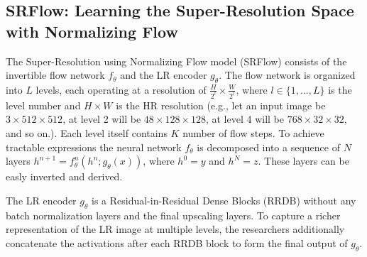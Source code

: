 \documentclass{article}
\begin{document}
\subsection{SRFlow: Learning the Super-Resolution Space with Normalizing Flow}
The Super-Resolution using Normalizing Flow model (SRFlow) \cite{srFlow} consists of the invertible flow network $f_{\theta}$ and the LR encoder $g_{\theta}$. The flow network is organized into $L$ levels, each operating at a resolution of $\frac{H}{2^l}\times\frac{W}{2^l}$, where $l \in \{1, ..., L\}$ is the level number and $H\times W$ is the HR resolution (e.g., let an input image be $3\times 512 \times 512$, at level 2 will be $48 \times 128 \times 128$, at level 4 will be $768 \times 32 \times 32$, and so on.). Each level itself contains $K$ number of flow steps. To achieve tractable expressions the neural network $f_\theta$ is decomposed into a sequence of $N$ layers $h^{n+1} = f_\theta ^n (h^n; g_\theta(x))$, where $h^0 = y$ and $h^N = z$. These layers can be easly inverted and derived.

The LR encoder $g_{\theta}$ is a Residual-in-Residual Dense Blocks (RRDB) \cite{rrdb} without any batch normalization layers and the final upscaling layers. To capture a richer representation of the LR image at multiple levels, the researchers additionally concatenate the activations after each RRDB block to form the final output of $g_\theta$.
\end{document}
